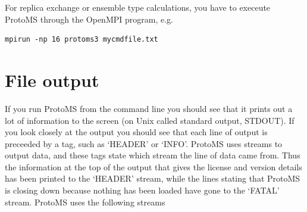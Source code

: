 \documentclass[letterpaper,10pt,english]{manual}
\begin{document}
For replica exchange or ensemble type calculations, you have to execeute ProtoMS through the OpenMPI program, e.g.

\begin{Verbatim}[commandchars=@\[\]]
mpirun -np 16 protoms3 mycmdfile.txt
\end{Verbatim}

\hypertarget{index-27}{}\section{File output}

If you run ProtoMS from the command line you should see that it prints out a lot of information to the screen (on Unix called standard output, STDOUT). If you look closely at the output you should see that each line of output is preceeded by a tag, such as ‘HEADER’ or ‘INFO’. ProtoMS uses streams to output data, and these tags state which stream the line of data came from. Thus the information at the top of the output that gives the license and version details has been printed to the ‘HEADER’ stream, while the lines stating that ProtoMS is closing down because nothing has been loaded have gone to the ‘FATAL’ stream. ProtoMS uses the following streams
\end{document}
